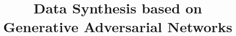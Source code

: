 \documentclass{vldb}
\begin{document}

\title{Data Synthesis based on Generative Adversarial Networks}




%
%
%
%

\end{document}
